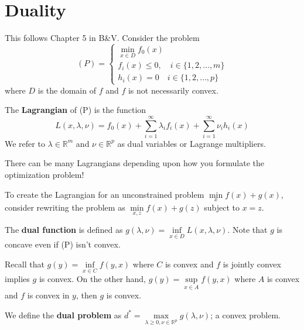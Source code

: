 \section{Duality}
This follows Chapter 5 in B\&V.
Consider the problem 
\[
(P) = \begin{cases} \min \limits_{x \in D} f_0(x)  \\
f_i(x) \le 0, \quad i \in \{1,2,\dots,m\} \\
h_i(x) =0 \quad i \in \{1,2,\dots,p\}
\end{cases}
\]
where $D$ is the domain of $f$ and $f$ is not necessarily convex.

\begin{defn}[Lagrangian]
The {\bf Lagrangian} of (P) is the function
\[
L(x,\lambda,\nu) = f_0(x) + \sum_{i=1}^\infty \lambda_i f_i(x) + \sum_{i=1}^\infty \nu_i h_i(x)
\]
We refer to $\lambda \in \mathbb{R}^m$ and $\nu \in \mathbb{R}^p$ as dual variables or Lagrange multipliers.
\end{defn}


\begin{rem}
 There can be many Lagrangians depending upon how you formulate the optimization problem!
 \end{rem}
 
 \begin{rem}
 To create the Lagrangian for an unconstrained problem $\min \limits_x f(x) + g(x)$, consider rewriting the problem as $\min \limits_{x,z} f(x) + g(z)$ subject to $x=z$.
 \end{rem}
 
 \begin{defn}
 The {\bf dual function} is defined as $g(\lambda,\nu) = \inf \limits_{x \in D} L(x,\lambda,\nu)$. Note that $g$ is concave even if (P) isn't convex.
 \end{defn}
 
 \begin{rem}
 Recall that $g(y) = \inf \limits_{x \in C} f(y,x)$ where $C$ is convex and $f$ is jointly convex implies $g$ is convex. On the other hand, $g(y) = \sup \limits_{x \in A} f(y,x)$ where $A$ is convex and $f$ is convex in $y$, then $g$ is convex.
 \end{rem}
 
 
 \begin{defn} We define the {\bf dual problem} as 
 $d^* = \max \limits_{ \lambda \ge 0, \nu \in \mathbb{R}^p} g(\lambda,\nu)$; a convex problem.
 \end{defn}
 
